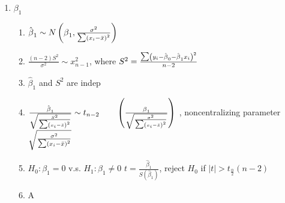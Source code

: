\documentclass{article}
\begin{document}
\begin{enumerate}
\item $\beta _{1}$

\begin{enumerate}
\item $\hat{\beta}_{1}\sim N\left( \beta _{1},\frac{\sigma ^{2}}{\tsum
\left( x_{i}-\bar{x}\right) ^{2}}\right) $

\item $\frac{\left( n-2\right) S^{2}}{\sigma ^{2}}\sim x_{n-1}^{2}$, where $%
S^{2}=\frac{\tsum \left( y_{i}-\hat{\beta}_{0}-\hat{\beta}_{1}x_{i}\right)
^{2}}{n-2}$

\item $\hat{\beta}_{1}$ and $S^{2}$ are indep

\item $\frac{\hat{\beta}_{1}}{\sqrt{\frac{S^{2}}{\tsum \left( x_{i}-\bar{x}%
\right) ^{2}}}}\sim t_{n-2}\qquad \left( \frac{\beta _{1}}{\sqrt{\frac{%
\sigma ^{2}}{\tsum \left( x_{i}-\bar{x}\right) ^{2}}}}\right) $ ,
noncentralizing parameter $\sqrt{\frac{\sigma ^{2}}{\tsum \left( x_{i}-\bar{x%
}\right) ^{2}}}$

\item $H_{0}:\beta _{1}=0$ v.s. $H_{1}:\beta _{1}\neq 0$\newline
$t=\frac{\hat{\beta}_{1}}{S\left( \hat{\beta}_{1}\right) }$, reject $H_{0}$
if $\left\vert t\right\vert >t_{\frac{\alpha }{2}}\left( n-2\right) $

\item A
\end{enumerate}
\end{enumerate}
\end{document}
